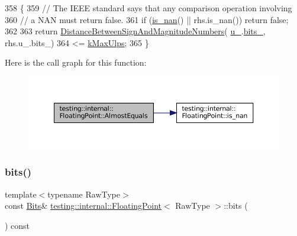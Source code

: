 \begin{DoxyCode}
358                                                     \{
359     \textcolor{comment}{// The IEEE standard says that any comparison operation involving}
360     \textcolor{comment}{// a NAN must return false.}
361     \textcolor{keywordflow}{if} (\hyperlink{classtesting_1_1internal_1_1FloatingPoint_a1fc654fd206efa98e480aa1e034f30d5}{is\_nan}() || rhs.is\_nan()) \textcolor{keywordflow}{return} \textcolor{keyword}{false};
362 
363     \textcolor{keywordflow}{return} \hyperlink{classtesting_1_1internal_1_1FloatingPoint_afe00f9f26ad2929a061f7e07b8a5071a}{DistanceBetweenSignAndMagnitudeNumbers}(
      \hyperlink{classtesting_1_1internal_1_1FloatingPoint_a2e0b6bd427248b91476f3fca281f7104}{u\_}.\hyperlink{uniontesting_1_1internal_1_1FloatingPoint_1_1FloatingPointUnion_aedb69e386f5d624a016f7a781302a2bf}{bits\_}, rhs.u\_.bits\_)
364         <= \hyperlink{classtesting_1_1internal_1_1FloatingPoint_aac498b3714d93f8e88cdc30e4c5935f6}{kMaxUlps};
365   \}
\end{DoxyCode}
Here is the call graph for this function\+:
\nopagebreak
\begin{figure}[H]
\begin{center}
\leavevmode
\includegraphics[width=350pt]{classtesting_1_1internal_1_1FloatingPoint_a965214c1af2f9ac5adb1393794aa81e5_cgraph}
\end{center}
\end{figure}
\mbox{\label{classtesting_1_1internal_1_1FloatingPoint_aab053be914bdc9e507c0db89740c318c}} 
\subsubsection{\texorpdfstring{bits()}{bits()}}
{\footnotesize\ttfamily template$<$typename Raw\+Type$>$ \\
const \hyperlink{classtesting_1_1internal_1_1FloatingPoint_abf228bf6cd48f12c8b44c85b4971a731}{Bits}\& \hyperlink{classtesting_1_1internal_1_1FloatingPoint}{testing\+::internal\+::\+Floating\+Point}$<$ Raw\+Type $>$\+::bits (\begin{DoxyParamCaption}{ }\end{DoxyParamCaption}) const\hspace{0.3cm}{\ttfamily [inline]}}



